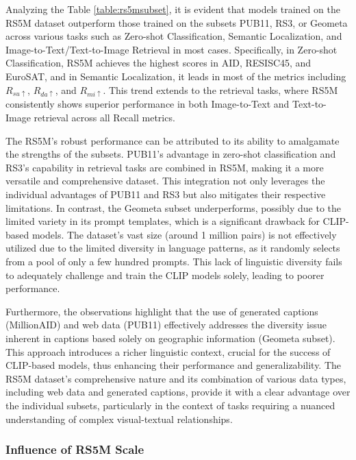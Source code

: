 \documentclass[journal]{IEEEtran}
\begin{document}
Analyzing the Table \ref{table:rs5msubset}, it is evident that models trained on the RS5M dataset outperform those trained on the subsets PUB11, RS3, or Geometa across various tasks such as Zero-shot Classification, Semantic Localization, and Image-to-Text/Text-to-Image Retrieval in most cases. Specifically, in Zero-shot Classification, RS5M achieves the highest scores in AID, RESISC45, and EuroSAT, and in Semantic Localization, it leads in most of the metrics including $R_{su\uparrow}$, $R_{da\uparrow}$, and $R_{mi\uparrow}$. This trend extends to the retrieval tasks, where RS5M consistently shows superior performance in both Image-to-Text and Text-to-Image retrieval across all Recall metrics.

The RS5M's robust performance can be attributed to its ability to amalgamate the strengths of the subsets. PUB11's advantage in zero-shot classification and RS3's capability in retrieval tasks are combined in RS5M, making it a more versatile and comprehensive dataset. This integration not only leverages the individual advantages of PUB11 and RS3 but also mitigates their respective limitations. In contrast, the Geometa subset underperforms, possibly due to the limited variety in its prompt templates, which is a significant drawback for CLIP-based models. The dataset's vast size (around 1 million pairs) is not effectively utilized due to the limited diversity in language patterns, as it randomly selects from a pool of only a few hundred prompts. This lack of linguistic diversity fails to adequately challenge and train the CLIP models solely, leading to poorer performance.

Furthermore, the observations highlight that the use of generated captions (MillionAID) and web data (PUB11) effectively addresses the diversity issue inherent in captions based solely on geographic information (Geometa subset). This approach introduces a richer linguistic context, crucial for the success of CLIP-based models, thus enhancing their performance and generalizability. The RS5M dataset's comprehensive nature and its combination of various data types, including web data and generated captions, provide it with a clear advantage over the individual subsets, particularly in the context of tasks requiring a nuanced understanding of complex visual-textual relationships.

\subsubsection{Influence of RS5M Scale}
\end{document}
